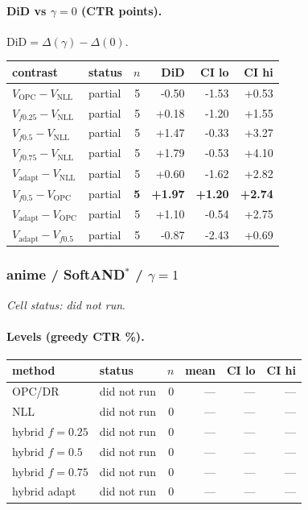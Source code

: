 \documentclass[10pt,a4paper]{article}
\begin{document}
\paragraph{DiD vs $\gamma=0$ (CTR points).} $\mathrm{DiD}=\Delta(\gamma)-\Delta(0)$.
{\centering\small\begin{tabular}{llrrrr}
\toprule contrast & status & $n$ & DiD & CI lo & CI hi \\
\midrule
$V_{\mathrm{OPC}}-V_{\mathrm{NLL}}$ & partial & 5 & -0.50 & -1.53 & +0.53 \\
$V_{f0.25}-V_{\mathrm{NLL}}$ & partial & 5 & +0.18 & -1.20 & +1.55 \\
$V_{f0.5}-V_{\mathrm{NLL}}$ & partial & 5 & +1.47 & -0.33 & +3.27 \\
$V_{f0.75}-V_{\mathrm{NLL}}$ & partial & 5 & +1.79 & -0.53 & +4.10 \\
$V_{\mathrm{adapt}}-V_{\mathrm{NLL}}$ & partial & 5 & +0.60 & -1.62 & +2.82 \\
\textbf{$V_{f0.5}-V_{\mathrm{OPC}}$} & partial & \textbf{5} & \textbf{+1.97} & \textbf{+1.20} & \textbf{+2.74} \\
$V_{\mathrm{adapt}}-V_{\mathrm{OPC}}$ & partial & 5 & +1.10 & -0.54 & +2.75 \\
$V_{\mathrm{adapt}}-V_{f0.5}$ & partial & 5 & -0.87 & -2.43 & +0.69 \\
\bottomrule\end{tabular}\par}
\bigskip
\subsubsection{anime / SoftAND$^*$ / $\gamma=1$}
\emph{Cell status: did not run}.
\paragraph{Levels (greedy CTR \%).}
{\centering\small\begin{tabular}{llrrrr}
\toprule method & status & $n$ & mean & CI lo & CI hi \\
\midrule
OPC/DR & did not run & 0 & --- & --- & --- \\
NLL & did not run & 0 & --- & --- & --- \\
hybrid $f{=}0.25$ & did not run & 0 & --- & --- & --- \\
hybrid $f{=}0.5$ & did not run & 0 & --- & --- & --- \\
hybrid $f{=}0.75$ & did not run & 0 & --- & --- & --- \\
hybrid adapt & did not run & 0 & --- & --- & --- \\
\bottomrule\end{tabular}\par}
\end{document}
